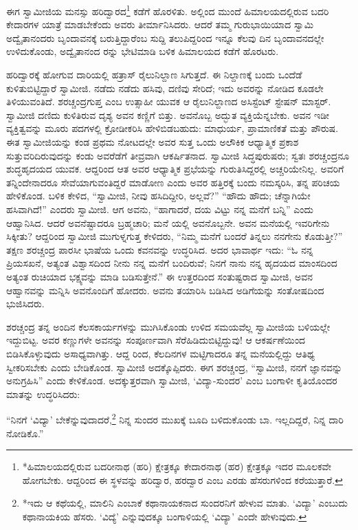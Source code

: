 ಈಗ ಸ್ವಾಮೀಜಿಯ ಮನಸ್ಸು ಹರಿದ್ವಾರದ\footnote{*ಹಿಮಾಲಯದಲ್ಲಿರುವ ಬದರೀನಾಥ (ಹರಿ) ಕ್ಷೇತ್ರಕ್ಕೂ ಕೇದಾರನಾಥ (ಹರ) ಕ್ಷೇತ್ರಕ್ಕೂ ಇದರ ಮೂಲಕವೇ ಹೋಗಬೇಕು. ಆದ್ದರಿಂದ ಈ ಸ್ಥಳವನ್ನು ಹರಿದ್ವಾರ, ಹರದ್ವಾರ ಎಂಬ ಎರಡು ಹೆಸರುಗಳಿಂದ ಕರೆಯುತ್ತಾರೆ.} ಕಡೆಗೆ ಹೊರಳಿತು. ಅಲ್ಲಿಂದ ಮುಂದೆ ಹಿಮಾಲಯದಲ್ಲಿರುವ ಬದರಿ ಕೇದಾರಗಳ ಯಾತ್ರೆ ಮಾಡಬೇಕೆಂದು ಅವರು ತೀರ್ಮಾನಿಸಿದರು. ಆದರೆ ತಮ್ಮ ಗುರುಭಾಯಿಯಾದ ಸ್ವಾಮಿ ಅದ್ವೈತಾನಂದರು ಬೃಂದಾವನಕ್ಕೆ ಬರುತ್ತಿದ್ದಾರೆಂಬ ಸುದ್ದಿ ತಲುಪಿದ್ದರಿಂದ ಇನ್ನೂ ಕೆಲವು ದಿನ ಬೃಂದಾವನದಲ್ಲೇ ಉಳಿದುಕೊಂಡು, ಅದ್ವೈತಾನಂದ ರನ್ನು ಭೇಟಿಮಾಡಿ ಬಳಿಕ ಹಿಮಾಲಯದ ಕಡೆಗೆ ಹೊರಟರು. 

ಹರಿದ್ವಾರಕ್ಕೆ ಹೋಗುವ ದಾರಿಯಲ್ಲಿ ಹತ್ರಾಸ್ ರೈಲುನಿಲ್ದಾಣ ಸಿಗುತ್ತದೆ. ಈ ನಿಲ್ದಾಣಕ್ಕೆ ಬಂದು ಒಂದೆಡೆ ಕುಳಿತುಬಿಟ್ಟಿದ್ದಾರೆ ಸ್ವಾಮೀಜಿ. ನಡೆದು ನಡೆದು ಹಸಿವು, ದಣಿವು ಸೇರಿದೆ; ಇದು ಅವರನ್ನು ನೋಡಿದ ಕೂಡಲೇ ತಿಳಿಯುವಂತಿದೆ. ಶರಚ್ಚಂದ್ರಗುಪ್ತ ಎಂಬ ಉತ್ಸಾಹೀ ಯುವಕ ಆ ರೈಲುನಿಲ್ದಾಣದ ಅಸಿಸ್ಟೆಂಟ್ ಸ್ಟೇಷನ್ ಮಾಸ್ಟರ್. ಸ್ವಾಮೀಜಿ ದಣಿದು ಕುಳಿತಿರುವ ದೃಶ್ಯ ಅವನ ಕಣ್ಣಿಗೆ ಬಿತ್ತು. ಅವನೊಬ್ಬ ಅದ್ಭುತ ವ್ಯಕ್ತಿಯೆನ್ನಬೇಕು. ಅವನ ಇಡೀ ವ್ಯಕ್ತಿತ್ವವನ್ನು ಮೂರು ಪದಗಳಲ್ಲಿ ಕ್ರೋಡೀಕರಿಸಿ ಹೇಳಿಬಿಡಬಹುದು: ಮಾಧುರ್ಯ, ಪ್ರಾಮಾಣಿಕತೆ ಮತ್ತು ಪೌರುಷ. ಈತ ಸ್ವಾಮೀಜಿಯನ್ನು ಕಂಡ ಪ್ರಥಮ ನೋಟದಲ್ಲೇ ಅವರ ಸುತ್ತ ಒಂದು ಅಲೌಕಿಕ ಆಧ್ಯಾತ್ಮಿಕ ಪ್ರಕಾಶ ಸುತ್ತುವರಿದಿರುವುದನ್ನು ಕಂಡು ಅವರೆಡೆಗೆ ತೀವ್ರವಾಗಿ ಆಕರ್ಷಿತನಾದ. ಸ್ವಾಮೀಜಿ ಸಿದ್ಧಪುರುಷರು; ಸ್ವತಃ ಶರಚ್ಚಂದ್ರನೂ ಶುದ್ಧಹೃದಯದ ಯುವಕ. ಆದ್ದರಿಂದ ಆತ ಅವರ ಆಧ್ಯಾತ್ಮಿಕ ಪ್ರಭೆಯನ್ನು ಗುರುತಿಸಿದ್ದರಲ್ಲಿ ಅಚ್ಚರಿಯೇನಿಲ್ಲ. ಅವರಿಗೆ ತನ್ನಿಂದೇನಾದರೂ ಸೇವೆಯಾಗುವಂತಿದ್ದರೆ ಮಾಡೋಣ ಎಂದು ಅವರ ಹತ್ತಿರಕ್ಕೆ ಬಂದು ನಮಸ್ಕರಿಸಿ, ತನ್ನ ಪರಿಚಯ ಹೇಳಿಕೊಂಡ. ಬಳಿಕ ಕೇಳಿದ, “ಸ್ವಾಮೀಜಿ, ನೀವು ಹಸಿದಿದ್ದೀರಿ, ಅಲ್ಲವೆ?” “ಹೌದು ಹೌದು; ಚೆನ್ನಾಗಿಯೇ ಹಸಿವಾಗಿದೆ!” ಎಂದರು ಸ್ವಾಮೀಜಿ. ಆಗ ಅವನು, “ಹಾಗಾದರೆ, ದಯ ವಿಟ್ಟು ನನ್ನ ಮನೆಗೆ ಬನ್ನಿ” ಎಂದು ಆಹ್ವಾನಿಸಿದ. ಆದರೆ ಅವನೆಷ್ಟಾದರೂ ಬ್ರಹ್ಮಚಾರಿ; ಮನೆ ಯಲ್ಲಿ ಅವನೊಬ್ಬನೇ. ಅವನ ಮನೆಯಲ್ಲಿ ಇವರಿಗೇನು ಸಿಕ್ಕೀತು? ಆದ್ದರಿಂದ ಸ್ವಾಮೀಜಿ ಮುಗುಳ್ನಗುತ್ತ ಕೇಳಿದರು, “ನಿಮ್ಮ ಮನೆಗೆ ಬಂದರೆ ತಿನ್ನಲು ನನಗೇನು ಕೊಡುತ್ತೀ?” ತಕ್ಷಣ ಶರಚ್ಚಂದ್ರ ಪಾರಸೀ ಭಾಷೆಯ ಒಂದು ಕವನವನ್ನು ಉದ್ಧರಿಸಿದ. ಅದರ ಭಾವಾರ್ಥ ಇದು: “ಓ ನನ್ನ ಪ್ರಿಯಸಖನೆ, ಅತ್ಯಂತ ವಿಶ್ವಾಸದಿಂದ ನೀನು ನನ್ನ ಮನೆಗೆ ಬಂದಿರುವೆ; ನಿನಗೆ ನಾನು ನನ್ನ ಹೃದಯದ ಮಾಂಸದಿಂದ ಅತ್ಯಂತ ರುಚಿಯಾದ ಭಕ್ಷ್ಯವನ್ನು ಮಾಡಿ ಬಡಿಸುತ್ತೇನೆ.” ಈ ಉತ್ತರದಿಂದ ಸಂತುಷ್ಟರಾದ ಸ್ವಾಮೀಜಿ, ಅವನ ಆಹ್ವಾನವನ್ನು ಮನ್ನಿಸಿ ಅವನೊಂದಿಗೆ ಹೋದರು. ಅವನು ತಯಾರಿಸಿ ಬಡಿಸಿದ ಅಡಿಗೆಯನ್ನು ಸಂತೋಷದಿಂದ ಭುಜಿಸಿದರು.

ಶರಚ್ಚಂದ್ರ ತನ್ನ ಅಂದಿನ ಕೆಲಸಕಾರ್ಯಗಳನ್ನು ಮುಗಿಸಿಕೊಂಡು ಉಳಿದ ಸಮಯವೆಲ್ಲ ಸ್ವಾಮೀಜಿಯ ಬಳಿಯಲ್ಲೇ ಇದ್ದುಬಿಟ್ಟ. ಅವರ ಕಣ್ಣುಗಳೇ ಅವನನ್ನು ಸಂಪೂರ್ಣವಾಗಿ ಸೆರೆಹಿಡಿದುಬಿಟ್ಟಿದ್ದುವು! ಆ ಆಕರ್ಷಣೆಯಿಂದ ಬಿಡಿಸಿಕೊಳ್ಳುವುದು ಅಸಾಧ್ಯವಾಗಿತ್ತು. ಆದ್ದ ರಿಂದ, ಕೆಲದಿನಗಳ ಮಟ್ಟಿಗಾದರೂ ತನ್ನ ಮನೆಯಲ್ಲಿದ್ದು ಆತಿಥ್ಯ ಸ್ವೀಕರಿಸಬೇಕು ಎಂದು ಬೇಡಿಕೊಂಡ. ಸ್ವಾಮೀಜಿ ಅದಕ್ಕೊಪ್ಪಿದರು. ಈಗ ಶರಚ್ಚಂದ್ರ, “ಸ್ವಾಮೀಜಿ, ನನಗೆ ಜ್ಞಾನವನ್ನು ಅನುಗ್ರಹಿಸಿ” ಎಂದು ಕೇಳಿಕೊಂಡ. ಅದಕ್ಕುತ್ತರವಾಗಿ ಸ್ವಾಮೀಜಿ, ‘ವಿದ್ಯಾ-ಸುಂದರ’ ಎಂಬ ಬಂಗಾಳೀ ಕೃತಿಯೊಂದರ ಮಾತನ್ನು ಉದ್ಧರಿಸಿದರು:

“ನಿನಗೆ ‘ವಿದ್ಯಾ’ ಬೇಕೆನ್ನುವುದಾದರೆ,\footnote{*ಇದು ಆ ಕಥೆಯಲ್ಲಿ, ಮಾಲಿನಿ ಎಂಬಾಕೆ ಕಥಾನಾಯಕನಾದ ಸುಂದರನಿಗೆ ಹೇಳುವ ಮಾತು. `ವಿದ್ಯಾ' ಎಂಬುದು ಕಥಾನಾಯಕಿಯ ಹೆಸರು. `ವಿದ್ಯೆ' ಎನ್ನುವುದಕ್ಕೂ ಬಂಗಾಳಿಯಲ್ಲಿ `ವಿದ್ಯಾ' ಎಂದೇ ಹೇಳುವುದು.} ನಿನ್ನ ಸುಂದರ ಮುಖಕ್ಕೆ ಬೂದಿ ಬಳಿದುಕೊಂಡು ಬಾ. ಇಲ್ಲದಿದ್ದರೆ, ನಿನ್ನ ದಾರಿ ನೋಡಿಕೊ.”

